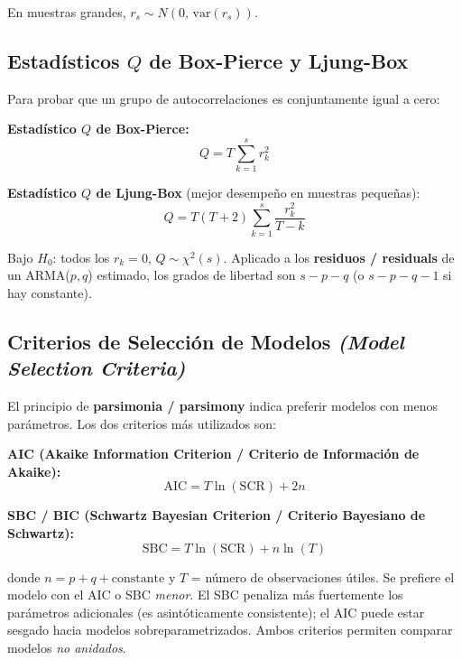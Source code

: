 \documentclass[12pt]{article}
\begin{document}
En muestras grandes, $r_s \sim N(0,\,\text{var}(r_s))$.

\subsection{Estad\'isticos $Q$ de Box-Pierce y Ljung-Box}

Para probar que un grupo de autocorrelaciones es conjuntamente igual a cero:

\textbf{Estad\'istico $Q$ de Box-Pierce:}
\begin{equation}
Q = T\sum_{k=1}^{s} r_k^2
\end{equation}

\textbf{Estad\'istico $Q$ de Ljung-Box} (mejor desempe\~no en muestras peque\~nas):
\begin{equation}
Q = T(T+2)\sum_{k=1}^{s}\frac{r_k^2}{T-k}
\end{equation}

Bajo $H_0$: todos los $r_k = 0$, $Q \sim \chi^2(s)$. Aplicado a los \textbf{residuos / residuals} de un ARMA($p,q$) estimado, los grados de libertad son $s - p - q$ (o $s - p - q - 1$ si hay constante).

\subsection{Criterios de Selecci\'on de Modelos \textit{(Model Selection Criteria)}}

El principio de \textbf{parsimonia / parsimony} indica preferir modelos con menos par\'ametros. Los dos criterios m\'as utilizados son:

\textbf{AIC (Akaike Information Criterion / Criterio de Informaci\'on de Akaike):}
\begin{equation}
\text{AIC} = T\ln(\text{SCR}) + 2n
\end{equation}

\textbf{SBC / BIC (Schwartz Bayesian Criterion / Criterio Bayesiano de Schwartz):}
\begin{equation}
\text{SBC} = T\ln(\text{SCR}) + n\ln(T)
\end{equation}

donde $n = p + q + \text{constante}$ y $T$ = n\'umero de observaciones \'utiles. Se prefiere el modelo con el AIC o SBC \textit{menor}. El SBC penaliza m\'as fuertemente los par\'ametros adicionales (es asint\'oticamente consistente); el AIC puede estar sesgado hacia modelos sobreparametrizados. Ambos criterios permiten comparar modelos \textit{no anidados}.
\end{document}
